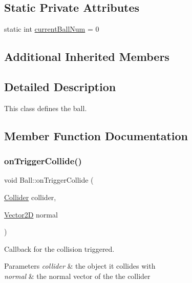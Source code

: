 \subsection*{Static Private Attributes}
\begin{DoxyCompactItemize}
\item 
static int \mbox{\hyperlink{class_ball_abfca3451ab889ecc9629e6717a80d099}{current\+Ball\+Num}} = 0
\end{DoxyCompactItemize}
\subsection*{Additional Inherited Members}


\subsection{Detailed Description}
This class defines the ball. 

\subsection{Member Function Documentation}
\mbox{\label{class_ball_a3b386c2b504c84e82554a6f502643a2b}} 
\subsubsection{\texorpdfstring{on\+Trigger\+Collide()}{onTriggerCollide()}}
{\footnotesize\ttfamily void Ball\+::on\+Trigger\+Collide (\begin{DoxyParamCaption}\item[{\mbox{\hyperlink{class_collider}{Collider}}}]{collider,  }\item[{\mbox{\hyperlink{struct_vector2_d}{Vector2D}}}]{normal }\end{DoxyParamCaption})\hspace{0.3cm}{\ttfamily [virtual]}}



Callback for the collision triggered. 


\begin{DoxyParams}{Parameters}
{\em collider} & the object it collides with \\
\hline
{\em normal} & the normal vector of the the collider \\
\hline
\end{DoxyParams}


